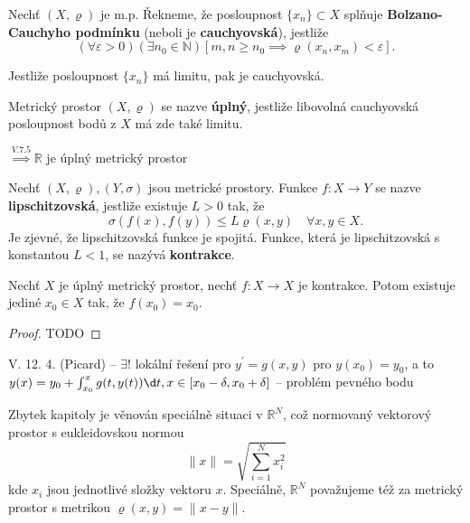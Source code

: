 \begin{definice}
Nechť $(X, \varrho)$ je m.p. Řekneme, že posloupnost $\{x_n\} \subset X$ splňuje \textbf{Bolzano-Cauchyho podmínku} (neboli je \textbf{cauchyovská}), jestliže
\[
\left(\forall \varepsilon > 0\right) \left(\exists n_0 \in \mathbb N\right) \left[ m, n \geq n_0 \implies \varrho(x_n, x_m) < \varepsilon \right].
\]
\end{definice}

\begin{poznamka}
Jestliže posloupnost $\{x_n\}$ má limitu, pak je cauchyovská.
\end{poznamka}

\begin{definice}
Metrický prostor $(X, \varrho)$ se nazve \textbf{úplný}, jestliže libovolná cauchyovská posloupnost bodů z $X$ má zde také limitu.
\end{definice}

\begin{poznamka}
  $\stackrel{V. 7. 5}{\implies} \mathbb R$ je úplný metrický prostor
\end{poznamka}

\begin{definice}
Nechť $(X, \varrho), (Y, \sigma)$ jsou metrické prostory. Funkce $f: X \to Y$ se nazve \textbf{lipschitzov\-ská}, jestliže existuje $L > 0$ tak, že
\[
\sigma(f(x), f(y)) \leq L \varrho(x, y) \quad \forall x, y \in X.
\]
Je zjevné, že lipschitzovská funkce je spojitá. Funkce, která je lipschitzovská s konstantou $L < 1$, se nazývá \textbf{kontrakce}.
\end{definice}

\begin{veta}
Nechť $X$ je úplný metrický prostor, nechť $f: X \to X$ je kontrakce. Potom existuje jediné $x_0 \in X$ tak, že $f(x_0) = x_0$.
\end{veta}

\begin{proof}
  TODO
\end{proof}

\begin{poznamka}
  V. 12. 4. (Picard) -- $\exists!$ lokální řešení pro $y^\prime = g(x,y)$ pro $y(x_0)=y_0$, a to $y(x) = y_0+\int_{x_0}^x g(t, y(t)) \d t, x \in [x_0 - \delta, x_0 + \delta]$ -- problém pevného bodu
\end{poznamka}

\begin{poznamka}
Zbytek kapitoly je věnován speciálně situaci v $\mathbb R^N$, což normovaný vektorový prostor s eukleidovskou normou
\[
\|x\| = \sqrt{\sum_{i=1}^N x_i^2}
\]
kde $x_i$ jsou jednotlivé složky vektoru $x$. Speciálně, $\mathbb R^N$ považujeme též za metrický prostor s metrikou $\varrho(x,y) = \|x - y\|$.
\end{poznamka}

